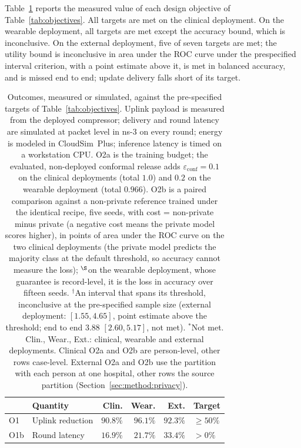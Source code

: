 Table~\ref{tab:results_objectives} reports the measured value of each design
objective of Table~\ref{tab:objectives}. All targets are met on the clinical
deployment. On the wearable deployment, all targets are met except the accuracy
bound, which is inconclusive. On the external deployment, five of seven targets
are met; the utility bound is inconclusive in area under the ROC curve under
the prespecified interval criterion, with a point estimate above it, is met in
balanced accuracy, and is missed end to end; update delivery falls short of
its target.

\begin{table}[!t]
\centering
\caption{Outcomes, measured or simulated, against the pre-specified targets
of Table~\ref{tab:objectives}. Uplink payload is measured from the deployed
compressor; delivery and round latency are simulated at packet level in ns-3
on every round; energy is modeled in CloudSim~Plus; inference latency is timed
on a workstation CPU. O2a is the training budget; the evaluated,
non-deployed conformal release adds $\varepsilon_{\mathrm{conf}} = 0.1$ on
the clinical deployments (total $1.0$) and $0.2$ on the wearable deployment
(total $0.966$). O2b is a paired comparison
against a non-private reference trained under the identical recipe, five seeds,
with cost = non-private minus private (a negative cost means the private model
scores higher), in points of area under the ROC curve on the two clinical deployments (the
private model predicts the majority class at the default threshold, so accuracy
cannot measure the loss); $^{\S}$on the wearable deployment, whose guarantee is
record-level, it is the loss in accuracy over fifteen seeds. $^{\dagger}$An
interval that spans its threshold, inconclusive at the pre-specified sample
size (external deployment: $[1.55, 4.65]$, point estimate above the threshold;
end to end $3.88$ $[2.60, 5.17]$, not met). $^{\ast}$Not met. Clin., Wear., Ext.: clinical, wearable and external
deployments. Clinical O2a and O2b are person-level, other rows case-level.
External O2a and O2b use the partition with each person at one hospital, other
rows the source partition (Section~\ref{sec:method:privacy}).}
\label{tab:results_objectives}
\small
\setlength{\tabcolsep}{3pt}
\begin{tabular}{llrrrl}
\toprule
& Quantity & Clin. & Wear. & Ext. & Target \\
\midrule
O1  & Uplink reduction   & $90.8\%$   & $96.1\%$   & $92.3\%$   & $\ge 50\%$ \\
O1b & Round latency      & $16.9\%$   & $21.7\%$   & $33.4\%$   & $> 0\%$ \\

\end{tabular}
\end{table}
